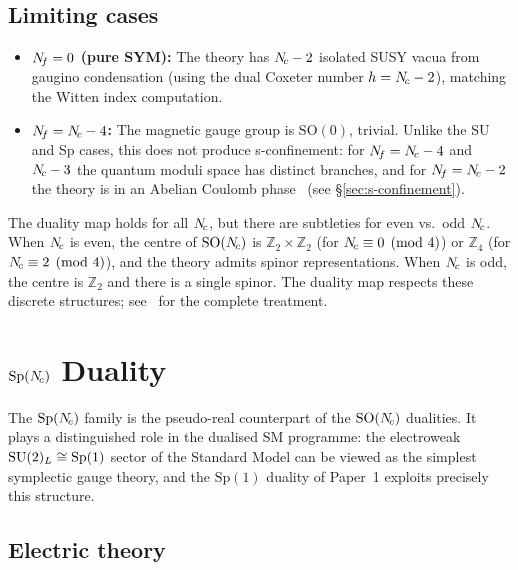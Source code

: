\documentclass[11pt,a4paper]{article}
\newcommand{\SO}[1]{\mathrm{SO}(#1)}
\newcommand{\Sp}[1]{\mathrm{Sp}(#1)}
\begin{document}
\subsection{Limiting cases}

\begin{itemize}
  \item \textbf{$N_{\!f} = 0$ (pure SYM):}
    The theory has $N_{\!c} - 2$ isolated SUSY vacua from gaugino
    condensation (using the dual Coxeter number $h = N_{\!c} - 2$),
    matching the Witten index computation.
  \item \textbf{$N_{\!f} = N_{\!c} - 4$:}
    The magnetic gauge group is $\SO{0}$, trivial.  Unlike the SU and
    Sp cases, this does not produce s-confinement: for
    $N_{\!f} = N_{\!c} - 4$ and $N_{\!c} - 3$ the quantum moduli space has distinct
    branches, and for $N_{\!f} = N_{\!c} - 2$ the theory is in an Abelian
    Coulomb phase~\cite{IS1995} (see \S\ref{sec:s-confinement}).
\end{itemize}

\begin{remark}[$\SO{\Nc}$ for even vs.\ odd $\Nc$]
The duality map holds for all $\Nc$, but there are subtleties for
even vs.\ odd $\Nc$.  When $\Nc$ is even, the centre of $\SO{\Nc}$
is $\mathbb{Z}_2 \times \mathbb{Z}_2$ (for $N_{\!c} \equiv 0 \pmod{4}$)
or $\mathbb{Z}_4$ (for $N_{\!c} \equiv 2 \pmod{4}$), and the theory
admits spinor representations.  When $\Nc$ is odd, the centre is
$\mathbb{Z}_2$ and there is a single spinor.  The duality map
respects these discrete structures; see~\cite{IS1995} for the
complete treatment.
\end{remark}


\section{$\Sp{\Nc}$ Duality}
\label{sec:Sp-duality}

The $\Sp{\Nc}$ family is the pseudo-real counterpart of the $\SO{\Nc}$
dualities.  It plays a distinguished role in the dualised SM programme:
the electroweak $\SU{2}_L \cong \Sp{1}$ sector of the Standard Model
can be viewed as the simplest symplectic gauge theory, and the $\Sp{1}$
duality of Paper~1 exploits precisely this structure.

\subsection{Electric theory}
\end{document}
